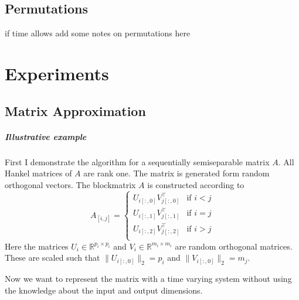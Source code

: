 \documentclass[doctype=mastersthesis,BCOR=15mm,biblatex]{ldvbook}%
\begin{document}
 

\section{Permutations}
if time allows add some notes on permutations here



\chapter{Experiments}



\section{Matrix Approximation}

\paragraph{Illustrative example}
First I demonstrate the algorithm for a sequentially semiseparable matrix $A$.
All Hankel matrices of $A$ are rank one. 
The matrix is generated form random orthogonal vectors.
The blockmatrix $A$ is constructed according to
\begin{equation}
	A_{[i,j]} = 
	\begin{cases}
	U_{i[:,0]} V_{j[:,0]}^\top & \text{if } i<j\\
	U_{i[:,1]} V_{j[:,1]}^\top & \text{if } i=j\\
	U_{i[:,2]} V_{j[:,2]}^\top & \text{if } i>j\\
	\end{cases}
\end{equation}
Here the matrices $U_i \in \mathbb{R}^{p_i\times p_i}$ and $V_i \in \mathbb{R}^{m_i\times m_i}$ are random orthogonal matrices. 
These are scaled such that $\|U_{i[:,0]}\|_2=p_i$ and $\|V_{i[:,0]}\|_2=m_j$.

Now we want to represent the matrix with a time varying system without using the knowledge about the input and output dimensions.
\end{document}
